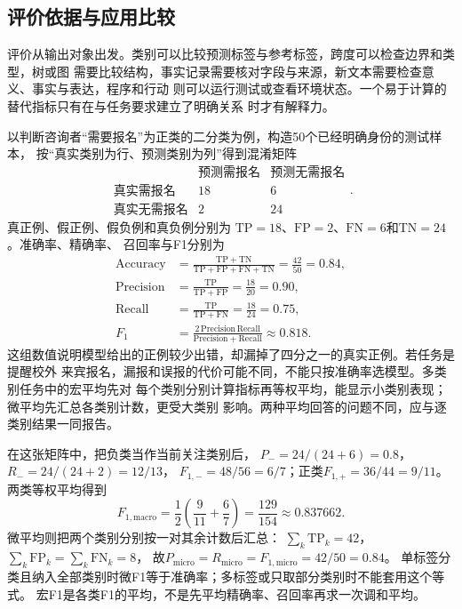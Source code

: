 \subsection{评价依据与应用比较}
\label{sec:nlp-evaluation-and-comparison}

评价从输出对象出发。类别可以比较预测标签与参考标签，跨度可以检查边界和类型，树或图
需要比较结构，事实记录需要核对字段与来源，新文本需要检查意义、事实与表达，程序和行动
则可以运行测试或查看环境状态。一个易于计算的替代指标只有在与任务要求建立了明确关系
时才有解释力。

以判断咨询者“需要报名”为正类的二分类为例，构造50个已经明确身份的测试样本，
按“真实类别为行、预测类别为列”得到混淆矩阵
\[
 \begin{array}{c|rr}
  & \text{预测需报名} & \text{预测无需报名}\\ \hline
  \text{真实需报名} & 18 & 6\\
  \text{真实无需报名} & 2 & 24
 \end{array}.
\]
真正例、假正例、假负例和真负例分别为
$\mathrm{TP}=18$、$\mathrm{FP}=2$、$\mathrm{FN}=6$和$\mathrm{TN}=24$。准确率、精确率、
召回率与F1分别为
\begin{align}
  \mathrm{Accuracy}
  &= \frac{\mathrm{TP}+\mathrm{TN}}
           {\mathrm{TP}+\mathrm{FP}+\mathrm{FN}+\mathrm{TN}}
   = \frac{42}{50}=0.84, \\
  \mathrm{Precision}
  &= \frac{\mathrm{TP}}{\mathrm{TP}+\mathrm{FP}}
   = \frac{18}{20}=0.90, \\
  \mathrm{Recall}
  &= \frac{\mathrm{TP}}{\mathrm{TP}+\mathrm{FN}}
   = \frac{18}{24}=0.75, \\
  F_1
  &= \frac{2\,\mathrm{Precision}\,\mathrm{Recall}}
           {\mathrm{Precision}+\mathrm{Recall}}
   \approx 0.818.
  \label{eq:nlp-classification-metrics}
\end{align}
这组数值说明模型给出的正例较少出错，却漏掉了四分之一的真实正例。若任务是提醒校外
来宾报名，漏报和误报的代价可能不同，不能只按准确率选模型。多类别任务中的宏平均先对
每个类别分别计算指标再等权平均，能显示小类别表现；微平均先汇总各类别计数，更受大类别
影响。两种平均回答的问题不同，应与逐类别结果一同报告。

在这张矩阵中，把负类当作当前关注类别后，
$P_-=24/(24+6)=0.8$，$R_-=24/(24+2)=12/13$，
$F_{1,-}=48/56=6/7$；正类$F_{1,+}=36/44=9/11$。
两类等权平均得到
\begin{equation}
 F_{1,\mathrm{macro}}
 =\frac12\left(\frac9{11}+\frac67\right)
 =\frac{129}{154}\approx0.837662.
 \label{eq:nlp-macro-f1}
\end{equation}
微平均则把两个类别分别按一对其余计数后汇总：
$\sum_k\mathrm{TP}_k=42$，$\sum_k\mathrm{FP}_k=\sum_k\mathrm{FN}_k=8$，
故$P_{\mathrm{micro}}=R_{\mathrm{micro}}=F_{1,\mathrm{micro}}=42/50=0.84$。
单标签分类且纳入全部类别时微F1等于准确率；多标签或只取部分类别时不能套用这个等式。
宏F1是各类F1的平均，不是先平均精确率、召回率再求一次调和平均。

